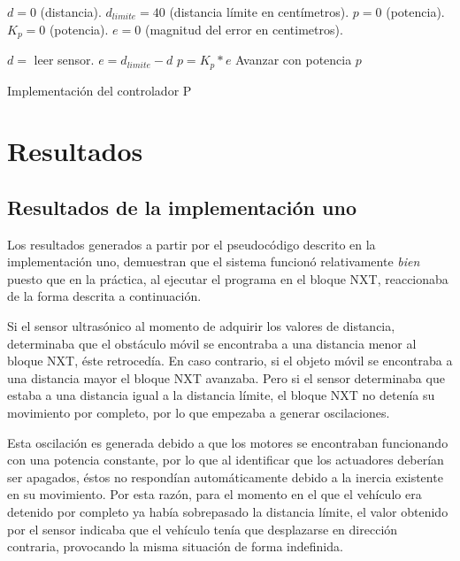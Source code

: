 \documentclass[journal]{IEEEtran}
\begin{document}
\begin{algorithm}
\begin{algorithmic}[1]

	\STATE $d = 0$ (distancia).
	\STATE $d_{limite} = 40$ (distancia límite en centímetros).
	\STATE $p = 0$ (potencia).
	\STATE $K_{p} = 0$ (potencia).
	\STATE $e = 0$ (magnitud del error en centimetros).

	\WHILE {\TRUE}
		\STATE $d = $ leer sensor.
		\STATE $e = d_{limite} - d$ 
		\STATE $p = K_{p} * e$ 
		\STATE Avanzar con potencia $p$
	\ENDWHILE
\end{algorithmic}
\caption{Implementación del controlador P}\label{alg:pseudocodigo-implementacion-controlador-p}
\end{algorithm}

\section{Resultados}
\subsection{Resultados de la implementación uno} 
\label{sub:resultados-implementacion-uno}
Los resultados generados a partir por el pseudocódigo descrito en la implementación uno, demuestran que el sistema funcionó relativamente \emph{bien} puesto que en la práctica, al ejecutar el programa en el bloque NXT, reaccionaba de la forma descrita a continuación.

Si el sensor ultrasónico al momento de adquirir los valores de distancia, determinaba que el obstáculo móvil se encontraba a una distancia menor al bloque NXT, éste retrocedía.
En caso contrario, si el objeto móvil se encontraba a una distancia mayor el bloque NXT avanzaba.
Pero si el sensor determinaba que estaba a una distancia igual a la distancia límite, el bloque NXT no detenía su movimiento por completo, por lo que empezaba a generar oscilaciones.

Esta oscilación es generada debido a que los motores se encontraban funcionando con una potencia constante, por lo que al identificar que los actuadores deberían ser apagados, éstos no respondían automáticamente debido a la inercia existente en su movimiento.
Por esta razón, para el momento en el que el vehículo era detenido por completo ya había sobrepasado la distancia límite, el valor obtenido por el sensor indicaba que el vehículo tenía que desplazarse en dirección contraria, provocando la misma situación de forma indefinida.
\end{document}
